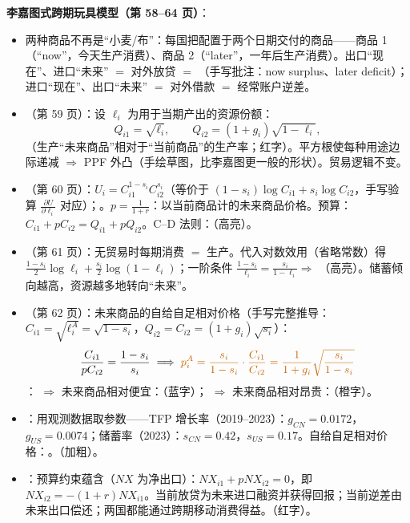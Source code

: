 \textbf{李嘉图式跨期玩具模型（第 58--64 页）}：
\begin{itemize}
  \item 两种商品不再是``小麦/布''：每国把配置于两个日期交付的商品——商品 1（``now''，今天生产消费）、商品 2（``later''，一年后生产消费）。出口``现在''、进口``未来'' $=$ 对外放贷 $=$ （手写批注：now surplus、later deficit）；进口``现在''、出口``未来'' $=$ 对外借款 $=$ 经常账户逆差。
  \item {}（第 59 页）：设 $\ell_i$ 为用于当期产出的资源份额：
  \[
  Q_{i1} = \sqrt{\ell_i}, \qquad Q_{i2} = (1 + g_i)\sqrt{1 - \ell_i},
  \]
  （生产``未来商品''相对于``当前商品''的生产率；红字）。平方根使每种用途边际递减 $\Rightarrow$ PPF 外凸（手绘草图，比李嘉图更一般的形状）。贸易逻辑不变。
  \item {}（第 60 页）：$U_i = C_{i1}^{1 - s_i} C_{i2}^{s_i}$（等价于 $(1-s_i)\log C_{i1} + s_i \log C_{i2}$，手写验算 $\frac{\partial U}{\partial \ell_i}$ 对应）；。$p = \frac{1}{1 + r}$：以当前商品计的未来商品价格。预算：$C_{i1} + p C_{i2} = Q_{i1} + p Q_{i2}$。C--D 法则：（高亮）。
  \item {}（第 61 页）：无贸易时每期消费 $=$ 生产。代入对数效用（省略常数）得 $\frac{1 - s_i}{2}\log \ell_i + \frac{s_i}{2}\log(1 - \ell_i)$；一阶条件 $\frac{1 - s_i}{\ell_i} = \frac{s_i}{1 - \ell_i} \Rightarrow$ （高亮）。储蓄倾向越高，资源越多地转向``未来''。
  \item {}（第 62 页）：未来商品的自给自足相对价格（手写完整推导：$C_{i1} = \sqrt{\ell_i^A} = \sqrt{1 - s_i}$，$Q_{i2} = C_{i2} = (1 + g_i)\sqrt{s_i}$）：
  \[
  \frac{C_{i1}}{p C_{i2}} = \frac{1 - s_i}{s_i}
  \;\Longrightarrow\;
  {\color{hlorange}p_i^A = \frac{s_i}{1 - s_i} \cdot \frac{C_{i1}}{C_{i2}} = \frac{1}{1 + g_i} \sqrt{\frac{s_i}{1 - s_i}}}
  \]
  ： $\Rightarrow$ 未来商品相对便宜：（蓝字）； $\Rightarrow$ 未来商品相对昂贵：（橙字）。
  \item {}：用观测数据取参数——TFP 增长率（2019--2023）：$g_{CN} = 0.0172$，$g_{US} = 0.0074$；储蓄率（2023）：$s_{CN} = 0.42$，$s_{US} = 0.17$。自给自足相对价格：。（加粗）。
  \item {}：预算约束蕴含（$NX$ 为净出口）：$NX_{i1} + p NX_{i2} = 0$，即 $NX_{i2} = -(1 + r) NX_{i1}$。当前放贷为未来进口融资并获得回报；当前逆差由未来出口偿还；两国都能通过跨期移动消费得益。（红字）。
\end{itemize}

